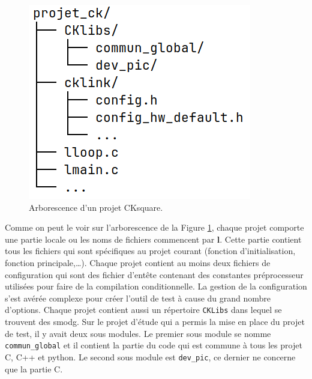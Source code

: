 \documentclass[a4paper]{article}
\begin{document}
\begin{figure}[h!]
  \begin{center}
    \includegraphics[scale=0.5]{./img/arborescence-proj.png}
    \caption{Arborescence d'un projet CKsquare.}
    \label{fig:arbrprojck}
  \end{center}
\end{figure}

Comme on peut le voir sur l'arborescence de la Figure \ref{fig:arbrprojck},
chaque projet comporte une partie locale ou les noms de fichiers commencent par
\textbf{l}. Cette partie contient tous les fichiers qui sont spécifiques au
projet courant (fonction d'initialisation, fonction principale,\dots). Chaque
projet contient au moins deux fichiers de configuration qui sont des fichier
d'entête contenant des constantes préprocesseur utilisées pour faire de la
compilation conditionnelle. La gestion de la configuration s'est avérée complexe
pour créer l'outil de test à cause du grand nombre d'options. Chaque projet
contient aussi un répertoire \verb|CKLibs| dans lequel se trouvent des
\gls{smodg}. Sur le projet d'étude qui a permis la mise en place du projet de
test, il y avait deux sous modules. Le premier sous module se nomme
\verb|commun_global| et il contient la partie du code qui est commune à tous les
projet C, C++ et python. Le second sous module est \verb|dev_pic|, ce dernier ne
concerne que la partie C.
\end{document}
